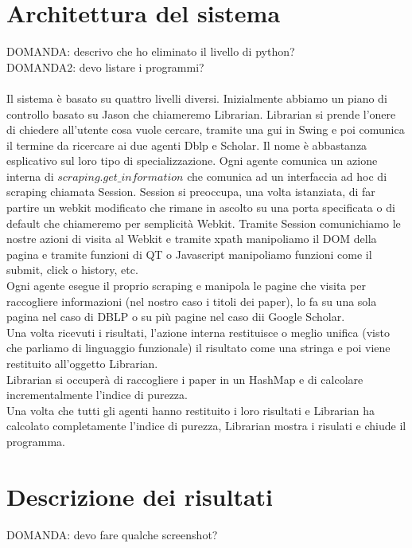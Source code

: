 \documentclass[12pt]{article}
\begin{document}
\section{Architettura del sistema}
DOMANDA: descrivo che ho eliminato il livello di python? \\
DOMANDA2: devo listare i programmi? \\
\\
Il sistema \`e basato su quattro livelli diversi. Inizialmente abbiamo un piano di controllo basato su Jason che chiameremo Librarian. Librarian si prende l'onere di chiedere all'utente cosa vuole cercare, tramite una gui in Swing e poi comunica il termine da ricercare ai due agenti Dblp e Scholar. Il nome \`e abbastanza esplicativo sul loro tipo di specializzazione. Ogni agente comunica un azione interna di $scraping.get\_information$ che comunica ad un interfaccia ad hoc di scraping chiamata Session. Session si preoccupa, una volta istanziata, di far partire un webkit modificato che rimane in ascolto su una porta specificata o di default che chiameremo per semplicit\`a Webkit. Tramite Session comunichiamo le nostre azioni di visita al Webkit e tramite xpath manipoliamo il DOM della pagina e tramite funzioni di QT o Javascript manipoliamo funzioni come il submit, click o history, etc. \\
Ogni agente esegue il proprio scraping e manipola le pagine che visita per raccogliere informazioni (nel nostro caso i titoli dei paper), lo fa su una sola pagina nel caso di DBLP o su pi\`u pagine nel caso dii Google Scholar.\\
Una volta ricevuti i risultati, l'azione interna restituisce o meglio unifica (visto che parliamo di linguaggio funzionale) il risultato come una stringa e poi viene restituito all'oggetto Librarian. \\
Librarian si occuper\`a di raccogliere i paper in un HashMap e di calcolare incrementalmente l'indice di purezza. \\
Una volta che tutti gli agenti hanno restituito i loro risultati e Librarian ha calcolato completamente l'indice di purezza, Librarian mostra i risulati e chiude il programma. 

\section{Descrizione dei risultati}
DOMANDA: devo fare qualche screenshot? \\
\end{document}
